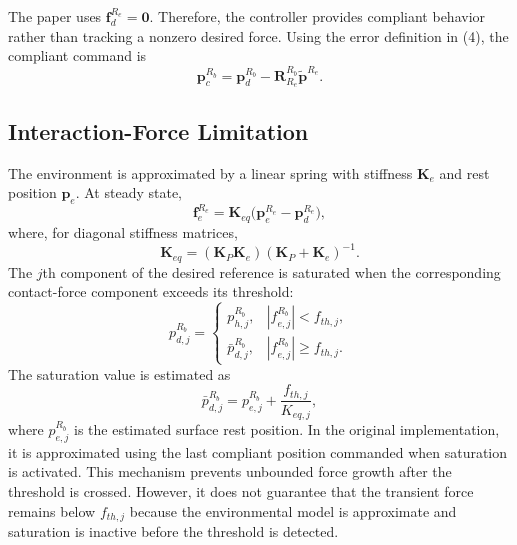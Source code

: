 \documentclass[journal]{IEEEtran}
\newcommand{\p}{\bm{p}}
\newcommand{\f}{\bm{f}}
\newcommand{\R}{\bm{R}}
\newcommand{\K}{\bm{K}}
\newcommand{\pt}{\widetilde{\bm{p}}}
\begin{document}
The paper uses $\f^{R_e}_d=\bm{0}$. Therefore, the controller provides compliant behavior rather than tracking a nonzero desired force. Using the error definition in (4), the compliant command is
\begin{equation}
\p^{R_b}_c=\p^{R_b}_d-\R^{R_b}_{R_e}\pt^{R_e}.
\end{equation}

\subsection{Interaction-Force Limitation}
The environment is approximated by a linear spring with stiffness $\K_e$ and rest position $\p_e$. At steady state,
\begin{equation}
\f^{R_e}_e=\K_{eq}\bigl(\p^{R_e}_e-\p^{R_e}_d\bigr),
\end{equation}
where, for diagonal stiffness matrices,
\begin{equation}
\K_{eq}=(\K_P\K_e)(\K_P+\K_e)^{-1}.
\end{equation}
The $j$th component of the desired reference is saturated when the corresponding contact-force component exceeds its threshold:
\begin{equation}
p^{R_b}_{d,j}=\begin{cases}
p^{R_b}_{h,j}, & |f^{R_b}_{e,j}|<f_{th,j},\\[2pt]
\bar p^{R_b}_{d,j}, & |f^{R_b}_{e,j}|\ge f_{th,j}.
\end{cases}
\end{equation}
The saturation value is estimated as
\begin{equation}
\bar p^{R_b}_{d,j}=p^{R_b}_{e,j}+\frac{f_{th,j}}{K_{eq,j}},
\end{equation}
where $p^{R_b}_{e,j}$ is the estimated surface rest position. In the original implementation, it is approximated using the last compliant position commanded when saturation is activated. This mechanism prevents unbounded force growth after the threshold is crossed. However, it does not guarantee that the transient force remains below $f_{th,j}$ because the environmental model is approximate and saturation is inactive before the threshold is detected.
\end{document}
